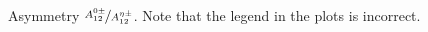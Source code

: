 \begin{figure}[H]
  \caption[Asymmetry $\nicefrac{A^{0\pm}_{12}}{A^{\eta\pm}_{12}}$]{Asymmetry $\nicefrac{A^{0\pm}_{12}}{A^{\eta\pm}_{12}}$. Note that the legend in the plots is incorrect.}
  \label{fig:exp_pi0_eta_ratio}
\end{figure}



